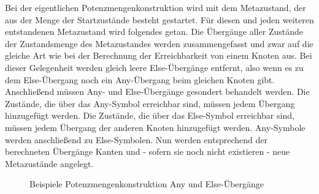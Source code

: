 Bei der eigentlichen Potenzmengenkonstruktion wird mit dem Metazustand, der aus der Menge der Startzustände besteht gestartet. Für diesen und jeden weiteren entstandenen Metazustand wird folgendes getan. Die Übergänge aller Zustände der Zustandsmenge des Metazustandes werden zusammengefasst und zwar auf die gleiche Art wie bei der Berechnung der Erreichbarkeit von einem Knoten aus. Bei dieser Gelegenheit werden gleich leere Else-Übergänge entfernt, also wenn es zu dem Else-Übergang noch ein Any-Übergang beim gleichen Knoten gibt. Anschließend müssen Any- und Else-Übergänge gesondert behandelt werden. Die Zustände, die über das Any-Symbol erreichbar sind, müssen jedem Übergang hinzugefügt werden. Die Zustände, die über das Else-Symbol erreichbar sind, müssen jedem Übergang der anderen Knoten hinzugefügt werden. Any-Symbole werden anschließend zu Else-Symbolen. Nun werden entsprechend der berechneten Übergänge Kanten und - sofern sie noch nicht existieren - neue Metazustände angelegt.
\begin{figure}[!htbp]
\centering
{}%
\hspace{0.1cm}
%
\caption{Beispiele Potenzmengenkonstruktion Any und Else-Übergänge}%
\end{figure}

